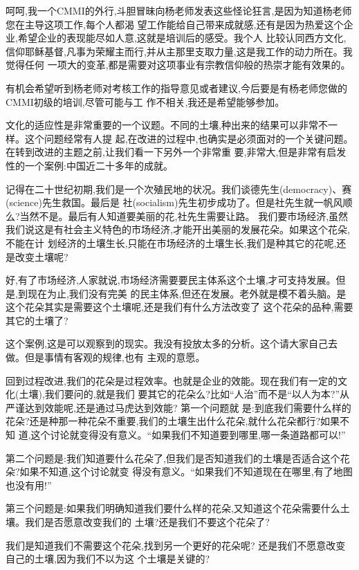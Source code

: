 \documentclass[11pt]{article}
\begin{document}
\begin{staff}
  呵呵,我一个CMMI的外行,斗胆冒昧向杨老师发表这些怪论狂言,是因为知道杨老师您在主导这项工作,每个人都渴
  望工作能给自己带来成就感,还有是因为热爱这个企业,希望企业的表现能尽如人意,这就是培训后的感受。我个人
  比较认同西方文化,信仰耶稣基督,凡事为荣耀主而行,并从主那里支取力量,这是我工作的动力所在。我觉得任何
  一项大的变革,都是需要对这项事业有宗教信仰般的热崇才能有效果的。

  有机会希望听到杨老师对考核工作的指导意见或者建议,今后要是有杨老师您做的CMMI初级的培训,尽管可能与工
  作不相关,我还是希望能够参加。
\end{staff}

\begin{yang}
  \ylogo 文化的适应性是非常重要的一个议题。不同的土壤,种出来的结果可以非常不一样。这个问题经常有人提
  起,在改进的过程中,也确实是必须面对的一个关键问题。在转到改进的主题之前,让我们看一下另外一个非常重
  要,非常大,但是非常有启发性的一个案例:中国近二十多年的成就。

  记得在二十世纪初期,我们是一个次殖民地的状况。我们谈德先生(democracy)、赛(science)先生救国。最后是
  社(socialism)先生初步成功了。但是社先生就一帆风顺么?当然不是。最后有人知道要美丽的花,社先生需要让路。
  我们要市场经济,虽然我们说这是有社会主义特色的市场经济,才能开出美丽的发展花朵。如果这个花朵,不能在计
  划经济的土壤生长,只能在市场经济的土壤生长,我们是种其它的花呢,还是改变土壤呢?

  好,有了市场经济,人家就说,市场经济需要要民主体系这个土壤,才可支持发展。但是,到现在为止,我们没有完美
  的民主体系,但还在发展。老外就是模不着头脑。是这个花朵其实是需要这个土壤呢,还是我们有什么方法改变了
  这个花朵的品种,需要其它的土壤了?

  这个案例,这是可以观察到的现实。我没有投放太多的分析。这个请大家自己去做。但是事情有客观的规律,也有
  主观的意愿。

  回到过程改进,我们的花朵是过程效率。也就是企业的效能。现在我们有一定的文化(土壤),我们要问的,就是我们
  要其它的花朵么?比如``人治''而不是``以人为本?''从严谨达到效能呢,还是通过马虎达到效能? 第一个问题就
  是:到底我们需要什么样的花朵?还是种那一种花朵不重要,我们的土壤生出什么花朵,就什么花朵都行?如果不知
  道,这个讨论就变得没有意义。``如果我们不知道要到哪里,哪一条道路都可以!''

  第二个问题是:我们知道要什么花朵了,但我们是否知道我们的土壤是否适合这个花朵?如果不知道,这个讨论就变
  得没有意义。``如果我们不知道现在在哪里,有了地图也没有用!''

  第三个问题是:如果我们明确知道我们要什么样的花朵,又知道这个花朵需要什么土壤。我们是否愿意改变我们的
  土壤?还是我们不要这个花朵了?

  我们是知道我们不需要这个花朵,找到另一个更好的花朵呢? 还是我们不愿意改变自己的土壤,因为我们不以为这
  个土壤是关键的?
\end{yang}
\end{document}
